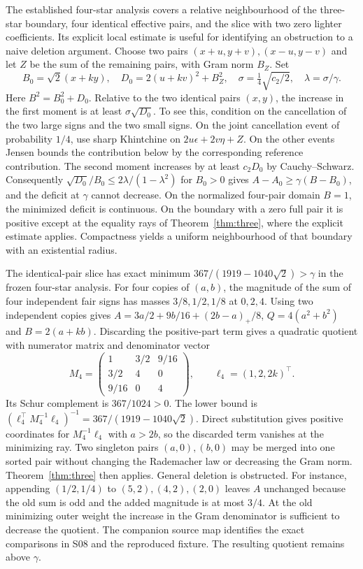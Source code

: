 The established four-star analysis covers a relative neighbourhood of
the three-star boundary, four identical effective pairs, and the slice
with two zero lighter coefficients. Its explicit local estimate is useful
for identifying an obstruction to a naive deletion argument. Choose two
pairs $(x+u,y+v),(x-u,y-v)$ and let $Z$ be the sum of the remaining
pairs, with Gram norm $B_Z$. Set
\[
 B_0=\sqrt2(x+ky),\quad D_0=2(u+kv)^2+B_Z^2,\quad
 \sigma=\tfrac14\sqrt{c_2/2},\quad \lambda=\sigma/\gamma .
\]
Here $B^2=B_0^2+D_0$. Relative to the two identical pairs $(x,y)$,
the increase in the first moment is at least $\sigma\sqrt{D_0}$.
To see this, condition on the cancellation of the two large signs and
the two small signs. On the joint cancellation event of probability
$1/4$, use sharp Khintchine on $2u\epsilon+2v\eta+Z$.
On the other events Jensen bounds the contribution below by the
corresponding reference contribution. The second moment increases by
at least $c_2D_0$ by Cauchy--Schwarz. Consequently
$\sqrt{D_0}/B_0\le 2\lambda/(1-\lambda^2)$ for $B_0>0$ gives
$A-A_0\ge\gamma(B-B_0)$, and the deficit at $\gamma$ cannot decrease.
On the normalized four-pair domain $B=1$, the minimized deficit is
continuous. On the boundary with a zero full pair it is positive
except at the equality rays of Theorem~\ref{thm:three}, where the
explicit estimate applies. Compactness yields a uniform neighbourhood
of that boundary with an existential radius.

The identical-pair slice has exact minimum
$367/(1919-1040\sqrt2)>\gamma$ in the frozen four-star analysis.
For four copies of $(a,b)$, the magnitude of the sum of four
independent fair signs has masses $3/8,1/2,1/8$ at $0,2,4$.
Using two independent copies gives
$A=3a/2+9b/16+(2b-a)_+/8$, $Q=4(a^2+b^2)$ and $B=2(a+kb)$.
Discarding the positive-part term gives a quadratic quotient
with numerator matrix and denominator vector
\[
 M_4=\begin{pmatrix}1&3/2&9/16\\3/2&4&0\\9/16&0&4\end{pmatrix},
 \qquad \ell_4=(1,2,2k)^\top .
\]
Its Schur complement is $367/1024>0$. The lower bound is
$(\ell_4^\top M_4^{-1}\ell_4)^{-1}=367/(1919-1040\sqrt2)$.
Direct substitution gives positive coordinates for $M_4^{-1}\ell_4$
with $a>2b$, so the discarded term vanishes at the minimizing ray.
Two singleton pairs $(a,0),(b,0)$ may be merged into one sorted pair
without changing the Rademacher law or decreasing the Gram norm.
Theorem~\ref{thm:three} then applies. General deletion is obstructed.
For instance, appending $(1/2,1/4)$ to $(5,2),(4,2),(2,0)$ leaves
$A$ unchanged because the old sum is odd and the added magnitude
is at most $3/4$. At the old minimizing outer weight the increase
in the Gram denominator is sufficient to decrease the quotient.
The companion source map identifies the exact comparisons in S08
and the reproduced fixture. The resulting quotient remains above
$\gamma$.

